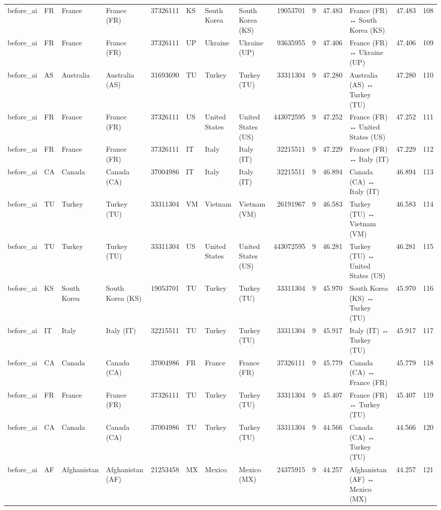 \begin{tabular}{llllrlllrrrlrr}
before\_ai & FR & France & France (FR) & 37326111 & KS & South Korea & South Korea (KS) & 19053701 & 9 & 47.483 & France (FR) ↔ South Korea (KS) & 47.483 & 108 \\
before\_ai & FR & France & France (FR) & 37326111 & UP & Ukraine & Ukraine (UP) & 93635955 & 9 & 47.406 & France (FR) ↔ Ukraine (UP) & 47.406 & 109 \\
before\_ai & AS & Australia & Australia (AS) & 31693690 & TU & Turkey & Turkey (TU) & 33311304 & 9 & 47.280 & Australia (AS) ↔ Turkey (TU) & 47.280 & 110 \\
before\_ai & FR & France & France (FR) & 37326111 & US & United States & United States (US) & 443072595 & 9 & 47.252 & France (FR) ↔ United States (US) & 47.252 & 111 \\
before\_ai & FR & France & France (FR) & 37326111 & IT & Italy & Italy (IT) & 32215511 & 9 & 47.229 & France (FR) ↔ Italy (IT) & 47.229 & 112 \\
before\_ai & CA & Canada & Canada (CA) & 37004986 & IT & Italy & Italy (IT) & 32215511 & 9 & 46.894 & Canada (CA) ↔ Italy (IT) & 46.894 & 113 \\
before\_ai & TU & Turkey & Turkey (TU) & 33311304 & VM & Vietnam & Vietnam (VM) & 26191967 & 9 & 46.583 & Turkey (TU) ↔ Vietnam (VM) & 46.583 & 114 \\
before\_ai & TU & Turkey & Turkey (TU) & 33311304 & US & United States & United States (US) & 443072595 & 9 & 46.281 & Turkey (TU) ↔ United States (US) & 46.281 & 115 \\
before\_ai & KS & South Korea & South Korea (KS) & 19053701 & TU & Turkey & Turkey (TU) & 33311304 & 9 & 45.970 & South Korea (KS) ↔ Turkey (TU) & 45.970 & 116 \\
before\_ai & IT & Italy & Italy (IT) & 32215511 & TU & Turkey & Turkey (TU) & 33311304 & 9 & 45.917 & Italy (IT) ↔ Turkey (TU) & 45.917 & 117 \\
before\_ai & CA & Canada & Canada (CA) & 37004986 & FR & France & France (FR) & 37326111 & 9 & 45.779 & Canada (CA) ↔ France (FR) & 45.779 & 118 \\
before\_ai & FR & France & France (FR) & 37326111 & TU & Turkey & Turkey (TU) & 33311304 & 9 & 45.407 & France (FR) ↔ Turkey (TU) & 45.407 & 119 \\
before\_ai & CA & Canada & Canada (CA) & 37004986 & TU & Turkey & Turkey (TU) & 33311304 & 9 & 44.566 & Canada (CA) ↔ Turkey (TU) & 44.566 & 120 \\
before\_ai & AF & Afghanistan & Afghanistan (AF) & 21253458 & MX & Mexico & Mexico (MX) & 24375915 & 9 & 44.257 & Afghanistan (AF) ↔ Mexico (MX) & 44.257 & 121 \\

\end{tabular}

